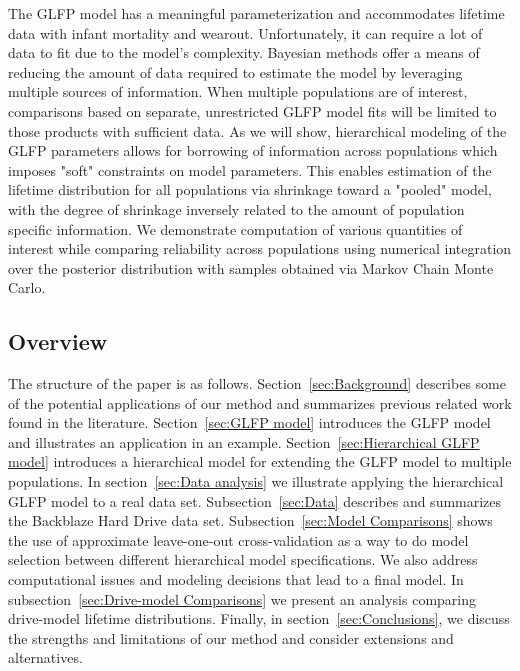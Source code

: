 \documentclass[12pt]{article}
\begin{document}
The GLFP model has a meaningful parameterization and accommodates lifetime data with infant mortality and wearout.  Unfortunately, it can require a lot of data to fit due to the model's complexity.  Bayesian methods offer a means of reducing the amount of data required to estimate the model by leveraging multiple sources of information. When multiple populations are of interest, comparisons based on separate, unrestricted GLFP model fits will be limited to those products with sufficient data. As we will show, hierarchical modeling of the GLFP parameters allows for borrowing of information across populations which imposes "soft" constraints on model parameters. This enables estimation of the lifetime distribution for all populations via shrinkage toward a "pooled" model, with the degree of shrinkage inversely related to the amount of population specific information. We demonstrate computation of various quantities of interest while comparing reliability across populations using numerical integration over the posterior distribution with samples obtained via  Markov Chain Monte Carlo. 



\subsection{Overview}
The structure of the paper is as follows.  Section~\ref{sec:Background} describes some of the potential applications of our method and summarizes previous related work found in the literature. Section~\ref{sec:GLFP model} introduces the GLFP model and illustrates an application in an example. Section~\ref{sec:Hierarchical GLFP model} introduces a hierarchical model for extending the GLFP model to multiple populations. In section~\ref{sec:Data analysis} we illustrate applying the hierarchical GLFP model to a real data set. Subsection~\ref{sec:Data} describes and summarizes the Backblaze Hard Drive data set.  Subsection~\ref{sec:Model Comparisons} shows the use of approximate leave-one-out cross-validation as a way to do model selection between different hierarchical model specifications. We also address computational issues and modeling decisions that lead to a final model.  In subsection~\ref{sec:Drive-model Comparisons} we present an analysis comparing drive-model lifetime distributions.  Finally, in section~\ref{sec:Conclusions}, we discuss the strengths and limitations of our method and consider extensions and alternatives.
\end{document}
